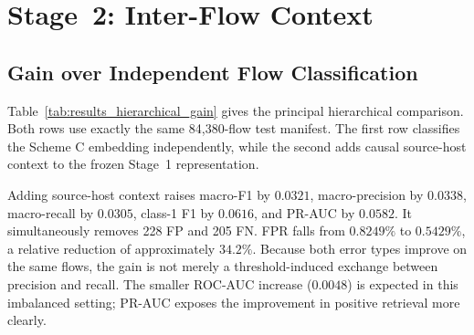 \section{Stage~2: Inter-Flow Context}
\label{subsec:results_stage2}

\subsection{Gain over Independent Flow Classification}
\label{subsubsec:results_hierarchical_gain}

Table~\ref{tab:results_hierarchical_gain} gives the principal hierarchical
comparison. Both rows use exactly the same 84,380-flow test manifest. The first
row classifies the Scheme C embedding independently, while the second adds
causal source-host context to the frozen Stage~1 representation.

\begin{table}[htbp]
    \centering
    \caption{Independent Stage~1 classification and the complete hierarchical
    system on the common full-data manifest.}
    \label{tab:results_hierarchical_gain}
\end{table}

Adding source-host context raises macro-F1 by $0.0321$, macro-precision by
$0.0338$, macro-recall by $0.0305$, class-1 F1 by $0.0616$, and PR-AUC by
$0.0582$. It simultaneously removes 228 FP and 205 FN. FPR falls from
$0.8249\%$ to $0.5429\%$, a relative reduction of approximately $34.2\%$.
Because both error types improve on the same flows, the gain is not merely a
threshold-induced exchange between precision and recall. The smaller ROC-AUC
increase ($0.0048$) is expected in this imbalanced setting; PR-AUC exposes the
improvement in positive retrieval more clearly.

